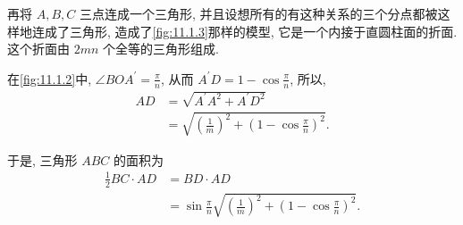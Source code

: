 再将 $A, B, C$ 三点连成一个三角形, 并且设想所有的有这种关系的三个分点都被这样地连成了三角形, 造成了\cref{fig:11.1.3}那样的模型, 它是一个内接于直圆柱面的折面. 这个折面由 $2 m n$ 个全等的三角形组成.

在\cref{fig:11.1.2}中, $\angle B O A^{\prime}=\frac{\pi}{n}$, 从而 $A^{\prime} D=1-\cos \frac{\pi}{n}$, 所以,
\begin{align*}
  A D &=\sqrt{A^{\prime} A^{2}+A^{\prime} D^{2}} \\
      &=\sqrt{\left(\frac{1}{m}\right)^{2}+\left(1-\cos \frac{\pi}{n}\right)^{2}}.
\end{align*}

于是, 三角形 $A B C$ 的面积为
\begin{align*}
  \frac{1}{2} B C \cdot A D &=B D \cdot A D \\
                            &=\sin \frac{\pi}{n} \sqrt{\left(\frac{1}{m}\right)^{2}+\left(1-\cos \frac{\pi}{n}\right)^{2}}.
\end{align*}

